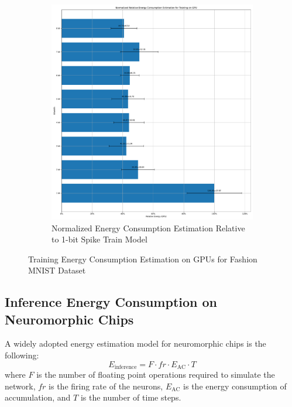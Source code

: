\begin{figure}[!htpb]
\begin{subfigure}[H]{0.48\textwidth}
                \includegraphics[width=\textwidth]{../standard/FashionMNIST/plots/fashionmnist_train_relative_energy_gpu.pdf}
                \caption{Normalized Energy Consumption Estimation Relative to 1-bit Spike Train Model}
            \end{subfigure}
            \caption{Training Energy Consumption Estimation on GPUs for Fashion MNIST Dataset}
            \label{fig:training_energy_gpu}
        \end{figure}

    \subsection{Inference Energy Consumption on Neuromorphic Chips}
    \label{subsec:inference_energy}
        A widely adopted energy estimation model for neuromorphic chips is the following:
        \begin{equation}
            \label{eq:inference_energy_popular}
            E_{\text{inference}} = F \cdot fr \cdot E_{\text{AC}} \cdot T
        \end{equation}
        where $F$ is the number of floating point operations required to simulate the network, $fr$ is the firing rate of the neurons, $E_{\text{AC}}$ is the energy consumption of accumulation, and $T$ is the number of time steps. 
    
